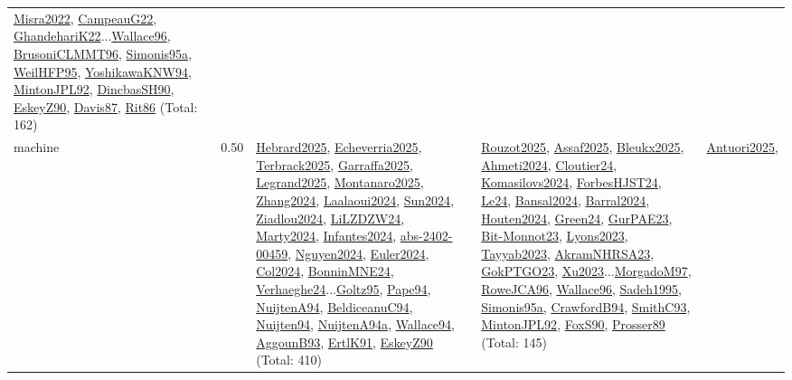 {\begin{longtable}{p{3cm}r>{\raggedright\arraybackslash}p{6cm}>{\raggedright\arraybackslash}p{6cm}>{\raggedright\arraybackslash}p{8cm}}
\hyperref[detail:Misra2022]{Misra2022}, \hyperref[detail:CampeauG22]{CampeauG22}, \hyperref[detail:GhandehariK22]{GhandehariK22}...\hyperref[detail:Wallace96]{Wallace96}, \hyperref[detail:BrusoniCLMMT96]{BrusoniCLMMT96}, \hyperref[detail:Simonis95a]{Simonis95a}, \hyperref[detail:WeilHFP95]{WeilHFP95}, \hyperref[detail:YoshikawaKNW94]{YoshikawaKNW94}, \hyperref[detail:MintonJPL92]{MintonJPL92}, \hyperref[detail:DincbasSH90]{DincbasSH90}, \hyperref[detail:EskeyZ90]{EskeyZ90}, \hyperref[detail:Davis87]{Davis87}, \hyperref[detail:Rit86]{Rit86} (Total: 162)\\
\index{machine}\index{Scheduling!machine}machine &  0.50 & \hyperref[detail:Hebrard2025]{Hebrard2025}, \hyperref[detail:Echeverria2025]{Echeverria2025}, \hyperref[detail:Terbrack2025]{Terbrack2025}, \hyperref[detail:Garraffa2025]{Garraffa2025}, \hyperref[detail:Legrand2025]{Legrand2025}, \hyperref[detail:Montanaro2025]{Montanaro2025}, \hyperref[detail:Zhang2024]{Zhang2024}, \hyperref[detail:Laalaoui2024]{Laalaoui2024}, \hyperref[detail:Sun2024]{Sun2024}, \hyperref[detail:Ziadlou2024]{Ziadlou2024}, \hyperref[detail:LiLZDZW24]{LiLZDZW24}, \hyperref[detail:Marty2024]{Marty2024}, \hyperref[detail:Infantes2024]{Infantes2024}, \hyperref[detail:abs-2402-00459]{abs-2402-00459}, \hyperref[detail:Nguyen2024]{Nguyen2024}, \hyperref[detail:Euler2024]{Euler2024}, \hyperref[detail:Col2024]{Col2024}, \hyperref[detail:BonninMNE24]{BonninMNE24}, \hyperref[detail:Verhaeghe24]{Verhaeghe24}...\hyperref[detail:Goltz95]{Goltz95}, \hyperref[detail:Pape94]{Pape94}, \hyperref[detail:NuijtenA94]{NuijtenA94}, \hyperref[detail:BeldiceanuC94]{BeldiceanuC94}, \hyperref[detail:Nuijten94]{Nuijten94}, \hyperref[detail:NuijtenA94a]{NuijtenA94a}, \hyperref[detail:Wallace94]{Wallace94}, \hyperref[detail:AggounB93]{AggounB93}, \hyperref[detail:ErtlK91]{ErtlK91}, \hyperref[detail:EskeyZ90]{EskeyZ90} (Total: 410) & \hyperref[detail:Rouzot2025]{Rouzot2025}, \hyperref[detail:Assaf2025]{Assaf2025}, \hyperref[detail:Bleukx2025]{Bleukx2025}, \hyperref[detail:Ahmeti2024]{Ahmeti2024}, \hyperref[detail:Cloutier24]{Cloutier24}, \hyperref[detail:Komasilovs2024]{Komasilovs2024}, \hyperref[detail:ForbesHJST24]{ForbesHJST24}, \hyperref[detail:Le24]{Le24}, \hyperref[detail:Bansal2024]{Bansal2024}, \hyperref[detail:Barral2024]{Barral2024}, \hyperref[detail:Houten2024]{Houten2024}, \hyperref[detail:Green24]{Green24}, \hyperref[detail:GurPAE23]{GurPAE23}, \hyperref[detail:Bit-Monnot23]{Bit-Monnot23}, \hyperref[detail:Lyons2023]{Lyons2023}, \hyperref[detail:Tayyab2023]{Tayyab2023}, \hyperref[detail:AkramNHRSA23]{AkramNHRSA23}, \hyperref[detail:GokPTGO23]{GokPTGO23}, \hyperref[detail:Xu2023]{Xu2023}...\hyperref[detail:MorgadoM97]{MorgadoM97}, \hyperref[detail:RoweJCA96]{RoweJCA96}, \hyperref[detail:Wallace96]{Wallace96}, \hyperref[detail:Sadeh1995]{Sadeh1995}, \hyperref[detail:Simonis95a]{Simonis95a}, \hyperref[detail:CrawfordB94]{CrawfordB94}, \hyperref[detail:SmithC93]{SmithC93}, \hyperref[detail:MintonJPL92]{MintonJPL92}, \hyperref[detail:FoxS90]{FoxS90}, \hyperref[detail:Prosser89]{Prosser89} (Total: 145) & \hyperref[detail:Antuori2025]{Antuori2025}, 
\end{longtable}}
